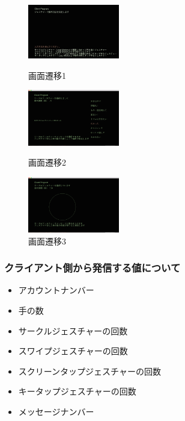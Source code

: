 \documentclass{funthesis}
\begin{document}
\begin{figure}[H]
 \begin{minipage}{0.3\hsize}
  \begin{center}
  \includegraphics[width=40mm]{./img/clseni1.png}
  \end{center}
  \caption{画面遷移1}
  \label{senni1}
 \end{minipage}
 \begin{minipage}{0.3\hsize}
  \begin{center}
  \includegraphics[width=40mm]{./img/clseni2.png}
  \end{center}
  \caption{画面遷移2}
  \label{senni2}
  \end{minipage}
   \begin{minipage}{0.3\hsize}
  \begin{center}
  \includegraphics[width=40mm]{./img/clseni3.png}
  \end{center}
  \caption{画面遷移3}
  \label{senni3}
  \end{minipage}
\end{figure}


\subsubsection{クライアント側から発信する値について}

\begin{itemize}
 \item アカウントナンバー
 \item 手の数
 \item サークルジェスチャーの回数
 \item スワイプジェスチャーの回数
  \item スクリーンタップジェスチャーの回数
 \item キータップジェスチャーの回数
 \item  メッセージナンバー
\end{itemize}
\end{document}

